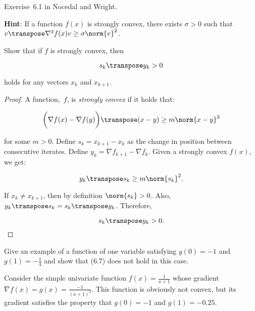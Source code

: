 \begin{problem}\label{prob:01}%
  Exercise~6.1 in Nocedal and Wright.



  \textbf{Hint}: \textnormal{If a function $f(x)$ is strongly convex, there exists $\sigma > 0$ such that $v\transpose \nabla^{2}f(x) v \geq \sigma \norm{v}^2$.}
\end{problem}

\begin{subproblem}
  Show that if $f$ is strongly convex, then

  \[ s_{k}\transpose y_k > 0 \]

  \vspace{-1em}
  holds for any vectors $x_k$ and $x_{k+1}$.
\end{subproblem}

\begin{proof}
  A function,~$f$, is \textit{strongly convex} if it holds that:

  \[\bigg(\nabla f(x) - \nabla f(y)\bigg)\transpose (x-y) \geq m \norm{x-y}^2 \]

  \noindent
  for some $m>0$.  Define $s_k=x_{k+1}-x_k$ as the change in position between consecutive iterates.  Define $y_k = \nabla f_{k+1} - \nabla f_k$. Given a strongly convex $f(x)$, we get:

  \[y_k\transpose s_k \geq m \norm{s_k}^2 \text{.}\]

  \noindent
  If $x_k \neq x_{k+1}$, then by definition $\norm{s_k}>0$. Also, $y_k\transpose s_k = s_k\transpose y_k$.  Therefore,

  \[s_k\transpose y_k >0 \text{.} \]
\end{proof}

\begin{subproblem}
  Give an example of a function of one variable satisfying $g(0)=-1$ and $g(1)=-\frac{1}{4}$ and show that (6.7) does not hold in this case.
\end{subproblem}

Consider the simple univariate function $f(x) =\frac{1}{x+1}$ whose gradient $\nabla f(x) = g(x)= \frac{-1}{(x+1)^2}$.  This function is obviously not convex, but its gradient satisfies the property that $g(0)=-1$ and $g(1) = -0.25$.


